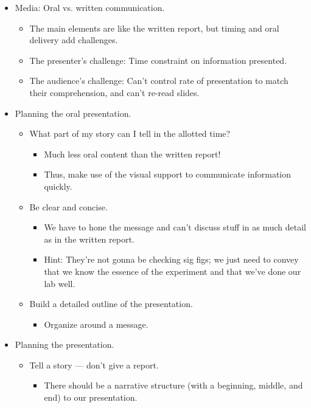\documentclass[../notes.tex]{subfiles}
\begin{document}
\begin{itemize}
\begin{itemize}
    \end{itemize}
    \item Media: Oral vs. written communication.
    \begin{itemize}
        \item The main elements are like the written report, but timing and oral delivery add challenges.
        \item The presenter's challenge: Time constraint on information presented.
        \item The audience's challenge: Can't control rate of presentation to match their comprehension, and can't re-read slides.
    \end{itemize}
    \item Planning the oral presentation.
    \begin{itemize}
        \item What part of my story can I tell in the allotted time?
        \begin{itemize}
            \item Much less oral content than the written report!
            \item Thus, make use of the visual support to communicate information quickly.
        \end{itemize}
        \item Be clear and concise.
        \begin{itemize}
            \item We have to hone the message and can't discuss stuff in as much detail as in the written report.
            \item Hint: They're not gonna be checking sig figs; we just need to convey that we know the essence of the experiment and that we've done our lab well.
        \end{itemize}
        \item Build a detailed outline of the presentation.
        \begin{itemize}
            \item Organize around a message.
        \end{itemize}
    \end{itemize}
    \item Planning the presentation.
    \begin{itemize}
        \item Tell a story --- don't give a report.
        \begin{itemize}
            \item There should be a narrative structure (with a beginning, middle, and end) to our presentation.

\end{itemize}
\end{itemize}
\end{itemize}
\end{document}
